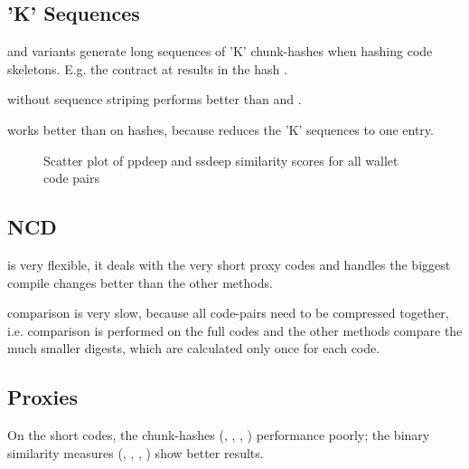 \documentclass[../main.tex]{subfiles}
\begin{document}
\subsection{'K' Sequences}
\begin{obs}
   and variants generate long sequences of 'K' chunk-hashes when hashing code skeletons.
  E.g. the contract  at  results in the hash .
\end{obs}
\begin{res}
   without sequence striping performs better than  and  .
\end{res}
\begin{res}
   works better than  on  hashes, because  reduces the 'K' sequences to one entry.
\end{res}


\begin{figure}[ht!]
  \centering
  \caption{Scatter plot of ppdeep and ssdeep similarity scores for all wallet code pairs}
  \label{fig:ssppScat}
\end{figure}

\subsection{NCD}
\begin{hyp}
   is very flexible, it deals with the very short proxy codes and handles the biggest compile changes better than the other methods.
\end{hyp}
\begin{res}
   comparison is very slow, because all code-pairs need to be compressed together, i.e.  comparison is performed on the full codes and the other methods compare the much smaller digests, which are calculated only once for each code.
\end{res}

\subsection{Proxies}
\begin{res}
  On the short  codes, the chunk-hashes (, , , ) performance poorly; the binary similarity measures (, , , ) show better results.
\end{res}
\end{document}
